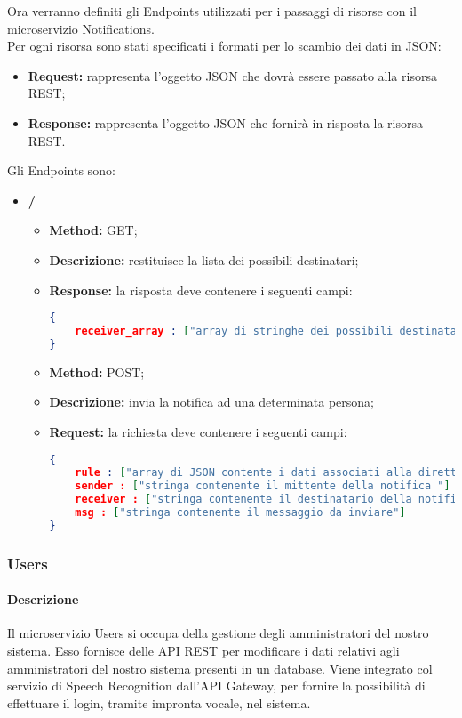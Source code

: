 Ora verranno definiti gli Endpoints utilizzati per i passaggi di risorse con il microservizio Notifications. \\
Per ogni risorsa sono stati specificati i formati per lo scambio dei dati in JSON: 
\begin{itemize}
\item \textbf{Request:} rappresenta l’oggetto JSON che dovrà essere passato alla risorsa REST;
\item \textbf{Response:} rappresenta l’oggetto JSON che fornirà in risposta la risorsa REST.
\end{itemize}
Gli Endpoints sono: 
\begin{itemize}

\item \textbf{/}\\
\begin{itemize}
\item \textbf{Method:} GET;
\item \textbf{Descrizione:} restituisce la lista dei possibili destinatari;
\item \textbf{Response:} la risposta deve contenere i seguenti campi:
\begin{lstlisting}[language=json,firstnumber=1]
{
	receiver_array : ["array di stringhe dei possibili destinatari"]
}
\end{lstlisting}
\end{itemize}

\begin{itemize}
\item \textbf{Method:} POST;
\item \textbf{Descrizione:} invia la notifica ad una determinata persona;
\item \textbf{Request:} la richiesta deve contenere i seguenti campi:
\begin{lstlisting}[language=json,firstnumber=1]
{
	rule : ["array di JSON contente i dati associati alla direttiva da inviare"]
	sender : ["stringa contenente il mittente della notifica "]
	receiver : ["stringa contenente il destinatario della notifica "]
	msg : ["stringa contenente il messaggio da inviare"]
}
\end{lstlisting}
\end{itemize}
\end{itemize}

\subsubsection{Users}
\paragraph{Descrizione}
Il microservizio Users si occupa della gestione degli amministratori del nostro sistema. Esso fornisce delle API REST per modificare i dati relativi agli amministratori del nostro sistema presenti in un database. Viene integrato col servizio di Speech Recognition dall'API Gateway, per fornire la possibilità di effettuare il login, tramite impronta vocale, nel sistema.
